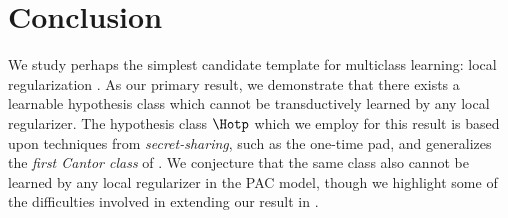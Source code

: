 \section{Conclusion}\label{Section:conclusion}

We study perhaps the simplest candidate template for multiclass learning: local regularization \citep{asilis-open-problem}. As our primary result, we demonstrate that there exists a learnable hypothesis class which cannot be transductively learned by any local regularizer. The hypothesis class $\Hotp$ which we employ for this result is based upon techniques from \emph{secret-sharing}, such as the one-time pad, and generalizes the \emph{first Cantor class} of \citet{DS14}. We conjecture that the same class also cannot be learned by any local regularizer in the PAC model, though we highlight some of the difficulties involved in extending our result in .  